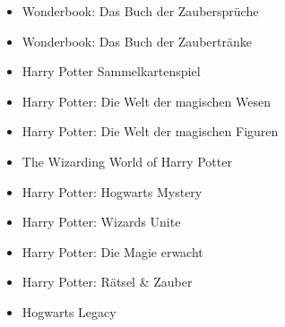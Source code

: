 \documentclass[a4paper, 10pt]{article}
\begin{document}
\begin{itemize}
    \item Wonderbook: Das Buch der Zaubersprüche
    \item Wonderbook: Das Buch der Zaubertränke
    \item Harry Potter Sammelkartenspiel
    \item Harry Potter: Die Welt der magischen Wesen
    \item Harry Potter: Die Welt der magischen Figuren
    \item The Wizarding World of Harry Potter
    \item Harry Potter: Hogwarts Mystery
    \item Harry Potter: Wizards Unite
    \item Harry Potter: Die Magie erwacht
    \item Harry Potter: Rätsel \& Zauber
    \item Hogwarts Legacy
\end{itemize}
\end{document}
